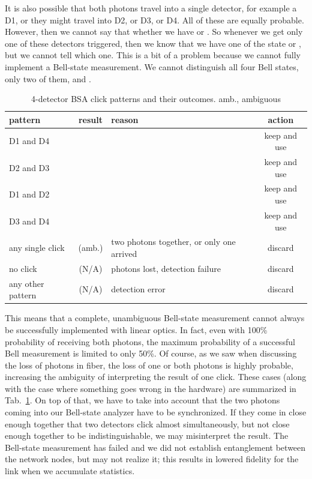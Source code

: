 It is also possible that both photons travel into a single detector, for example a D1, or they might travel into D2, or D3, or D4. All of these are equally probable. However, then we cannot say that whether we have \ket{\Phi^+} or \ket{\Phi^-}. So whenever we get only one of these detectors triggered, then we know that we have one of the state \ket{\Psi^+} or \ket{\Psi^-}, but we cannot tell which one. This is a bit of a problem because we cannot fully implement a Bell-state measurement. We cannot distinguish all four Bell states, only two of them, \ket{\Psi^+} and \ket{\Psi^-}.

\begin{table}
\centering
\begin{tabular}{p{0.55in}|c|p{1.5in}|c}
pattern  & result & reason & action \\\hline
D1 and D4 & \ket{\Psi^-} & & keep and use \\
D2 and D3 & \ket{\Psi^-} & & keep and use \\
D1 and D2 & \ket{\Psi^+} & & keep and use \\
D3 and D4 & \ket{\Psi^+} & & keep and use \\
any single click & \ket{\Phi^\pm} (amb.)  & two photons together, or only one arrived & discard \\
no click & (N/A) & photons lost, detection failure & discard \\
any other pattern & (N/A) & detection error & discard
\end{tabular}
\caption{4-detector BSA click patterns and their outcomes. amb., ambiguous}
\label{tab:bsa-clicks}
\end{table}


This means that a complete, unambiguous Bell-state measurement cannot always be successfully implemented with linear optics. In fact, even with 100\% probability of receiving both photons, the maximum probability of a successful Bell measurement is limited to only 50\%.  Of course, as we saw when discussing the loss of photons in fiber, the loss of one or both photons is highly probable, increasing the ambiguity of interpreting the result of one click.  These cases (along with the case where something goes wrong in the hardware) are summarized in Tab.~\ref{tab:bsa-clicks}. 
On top of that, we have to take into account that the two photons coming into our Bell-state analyzer have to be synchronized. If they come in close enough together that two detectors click almost simultaneously, but not close enough together to be indistinguishable, we may misinterpret the result. The Bell-state measurement has failed and we did not establish entanglement between the network nodes, but may not realize it; this results in lowered fidelity for the link when we accumulate statistics.


